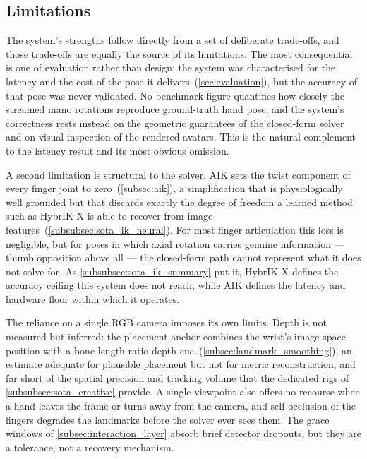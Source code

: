 \subsection{Limitations}\label{subsec:conclusion_limitations}

The system's strengths follow directly from a set of deliberate trade-offs, and those
trade-offs are equally the source of its limitations. The most consequential is one of
evaluation rather than design: the system was characterised for the latency and the cost
of the pose it delivers~(\autoref{sec:evaluation}), but the accuracy of that pose was
never validated. No benchmark figure quantifies how closely the streamed \acrshort{mano}
rotations reproduce ground-truth hand pose, and the system's correctness rests instead
on the geometric guarantees of the closed-form solver and on visual inspection of the
rendered avatars. This is the natural complement to the latency result and its most
obvious omission.

A second limitation is structural to the solver. AIK sets the twist component of every
finger joint to zero~(\autoref{subsec:aik}), a simplification that is physiologically
well grounded but that discards exactly the degree of freedom a learned method such as
HybrIK-X \cite{li2023hybrikx} is able to recover from image
features~(\autoref{subsubsec:sota_ik_neural}). For most finger articulation this loss
is negligible, but for poses in which axial rotation carries genuine information ---
thumb opposition above all --- the closed-form path cannot represent what it does not
solve for. As \autoref{subsubsec:sota_ik_summary} put it, HybrIK-X defines the accuracy
ceiling this system does not reach, while AIK defines the latency and hardware floor
within which it operates.

The reliance on a single RGB camera imposes its own limits. Depth is not measured but
inferred: the placement anchor combines the wrist's image-space position with a
bone-length-ratio depth cue~(\autoref{subsec:landmark_smoothing}), an estimate adequate
for plausible placement but not for metric reconstruction, and far short of the spatial
precision and tracking volume that the dedicated rigs of \autoref{subsubsec:sota_creative}
provide. A single viewpoint also offers no recourse when a hand leaves the frame or
turns away from the camera, and self-occlusion of the fingers degrades the landmarks
before the solver ever sees them. The grace windows of \autoref{subsec:interaction_layer}
absorb brief detector dropouts, but they are a tolerance, not a recovery mechanism.

